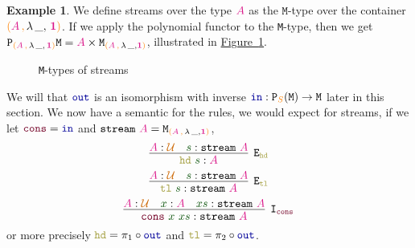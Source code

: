 \documentclass[twoside,11pt,openright]{report}
\theoremstyle{plain} %
\theoremstyle{definition}
\newtheorem{exmp}{Example} %
\theoremstyle{remark}
\newcommand*{\figref}[1]{\hyperref[fig:#1]{Figure~\ref*{fig:#1}}}
\newcommand*{\term}[1]{\textcolor{green!30!black}{#1}} %
\newcommand*{\type}[1]{\textcolor{magenta!90!black}{#1}}
\newcommand*{\container}[1]{\textcolor{orange}{#1}}
\newcommand*{\containerpair}[2]{\ensuremath{\colorlet{savedleftcolor}{.}\color{orange}\left(\color{savedleftcolor}#1\,\textcolor{orange}{\mathbf{,}}\,#2\color{orange}\right)\color{savedleftcolor}}}
\newcommand*{\containerpairsimple}[2]{\containerpair{#1}{\lambda\,\_,\,#2}}
\newcommand*{\universe}[1]{\textcolor{orange!80!black}{#1}}
\newcommand*{\unit}{\type{\textbf{1}}}
\newcommand*{\function}[1]{\textcolor{blue!60!black}{\ensuremath{\mathtt{#1}}}}
\newcommand*{\constructor}[1]{\textcolor{purple!60!black}{\ensuremath{\mathtt{#1}}}}
\newcommand*{\destructor}[1]{\textcolor{yellow!60!black}{\ensuremath{\mathtt{#1}}}}
\newcommand*{\typeformer}[1]{\ensuremath{\mathtt{#1}}}
\newcommand*{\functor}[1]{\ensuremath{\mathbf{\mathtt{#1}}}}
\begin{document}
\begin{exmp} We define streams over the type \(\type{A}\) as the \(\mathtt{M}\)-type over the container \(\containerpairsimple{\type{A}}{\unit}\). If we apply the polynomial functor to the \texttt{M}-type, then we get \(\functor{P}_{\containerpairsimple{\type{A}}{\unit}} \typeformer{M} = \type{A} \times \typeformer{M}_{\containerpair{\type{A}}{\lambda\,\_,\unit}}\), illustrated in \figref{stream-M-type}.
  \begin{figure}[h]
    \centering
    \caption{\texttt{M}-types of streams}
    \label{fig:stream-M-type}
  \end{figure}
  We will that \(\function{out}\) is an isomorphism with inverse \(\function{in} : \functor{P}_{\container{S}}(\typeformer{M}) \rightarrow \typeformer{M}\) later in this section. We now have a semantic for the rules, we would expect for streams, if we let \(\constructor{cons} = \function{in}\) and \(\typeformer{stream}~\type{A} = \typeformer{M}_{\containerpair{\type{A}}{\lambda\,\_,\unit}}\),
  \begin{equation}
    \vcenter{\infer[\mathtt{E}_{\destructor{hd}}]{\destructor{hd}~\term{s} : \type{A}}{\type{A} : \universe{\mathcal{U}} & \term{s} : \typeformer{stream}~\type{A}}}
  \end{equation}
  \begin{equation}
    \vcenter{\infer[\mathtt{E}_{\destructor{tl}}]{\destructor{tl}~\term{s} : \typeformer{stream}~\type{A}}{\type{A} : \universe{\mathcal{U}} & \term{s} : \typeformer{stream}~\type{A}}}
  \end{equation}
  \begin{equation}
    \vcenter{\infer[\mathtt{I}_{\constructor{cons}}]{\term{\constructor{cons}}~\term{x}~\term{xs} : \typeformer{stream}~\type{A}}{\type{A} : \universe{\mathcal{U}} & \term{x} : \type{A} & \term{xs} : \typeformer{stream}~\type{A}}}
  \end{equation}
  or more precisely \(\destructor{hd} = \pi_1 \circ \function{out}\) and \(\destructor{tl} = \pi_2 \circ \function{out}\).
\end{exmp}
\end{document}
